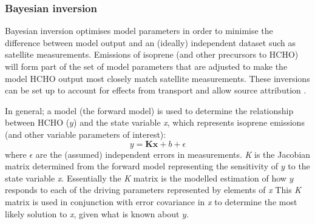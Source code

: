     
    
    
    \subsubsection{Bayesian inversion}
    
      Bayesian inversion optimises model parameters in order to minimise the difference between model output and an (ideally) independent dataset such as satellite measurements.
      Emissions of isoprene (and other precursors to HCHO) will form part of the set of model parameters that are adjusted to make the model HCHO output most closely match satellite measurements.
      These inversions can be set up to account for effects from transport and allow source attribution \parencite[e.g.][]{Curci2010,FortemsCheiney2012}.
      
      In general; a model (the forward model) is used to determine the relationship between HCHO ($y$) and the state variable \emph{x}, which represents isoprene emissions (and other variable parameters of interest):
      \begin{equation}
        \label{BioIsop:intro:top_down_estimates:eqn_bayesian}
        y=\mathbf{Kx} + b + \epsilon
      \end{equation}
      where $\epsilon$ are the (assumed) independent errors in measurements.
      \emph{K} is the Jacobian matrix determined from the forward model representing the sensitivity of $y$ to the state variable \emph{x}.
      Essentially the \emph{K} matrix is the modelled estimation of how $y$ responds to each of the driving parameters represented by elements of \emph{x}
      This \emph{K} matrix is used in conjunction with error covariance in \emph{x} to determine the most likely solution to \emph{x}, given what is known about $y$. %
      
